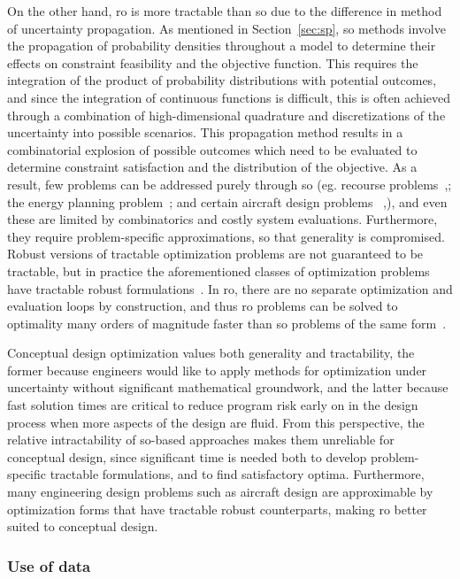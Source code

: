On the other hand, \gls{ro} is more tractable than \gls{so} due to the difference in method of uncertainty propagation.
As mentioned in Section~\ref{sec:sp},
\gls{so} methods involve the propagation of probability densities throughout a model
to determine their effects on constraint feasibility and the objective function.
This requires the integration of the product of probability distributions with potential outcomes,
and since the integration of continuous functions is difficult, this is often achieved through
a combination of high-dimensional quadrature and discretizations of the uncertainty into
possible scenarios. This propagation method
results in a combinatorial explosion of possible outcomes which need to be evaluated to determine constraint
satisfaction and the distribution of the objective. As a result, few problems can be addressed purely
through \gls{so}
(eg. recourse problems~\cite{Kall1982},\cite{Higle1991}; the energy planning problem~\cite{Pereira1991};
and certain aircraft design problems ~\cite{Liem2015},\cite{Liem2017}), and
even these are limited by combinatorics and costly system evaluations. Furthermore, they require
problem-specific approximations, so that generality is compromised.
Robust versions of tractable optimization problems are not
guaranteed to be tractable, but in practice the aforementioned classes of optimization problems
have tractable robust formulations~\cite{Bertsimas2011}. In \gls{ro},
there are no separate optimization and evaluation
loops by construction, and thus \gls{ro} problems can be solved to optimality
many orders of magnitude faster than \gls{so} problems of the same form~\cite{Bertsimas2011}.

Conceptual design optimization values both generality and tractability, the former
because engineers would like to
apply methods for optimization under uncertainty without significant mathematical groundwork,
and the latter because fast solution times are critical
to reduce program risk early on in the design process when more aspects
of the design are fluid. From this perspective, the relative intractability of
\gls{so}-based approaches makes them unreliable for conceptual design, since significant time is
needed both to develop problem-specific tractable formulations, and to find satisfactory optima.
Furthermore,
many engineering design problems such as aircraft design are approximable by optimization
forms that have tractable robust counterparts, making \gls{ro} better suited
to conceptual design.

\subsubsection{Use of data}

